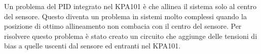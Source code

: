 Un problema del PID integrato nel KPA101 è che allinea il sistema solo al centro del sensore. Questo diventa un problema in sistemi molto complessi quando la posizione di ottimo allineamento non combacia con il centro del sensore. Per risolvere questo problema è stato creato un circuito che aggiunge delle tensioni di bias a quelle uscenti dal sensore ed entranti nel KPA101.


